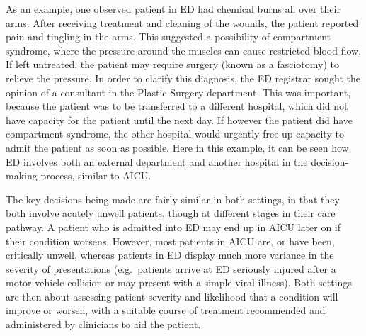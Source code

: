 \documentclass[a4paper, nobind]{templates/ociamthesis}
\begin{document}
\hfill\break
As an example, one observed patient in ED had chemical burns all over their arms. After receiving treatment and cleaning of the wounds, the patient reported pain and tingling in the arms. This suggested a possibility of compartment syndrome, where the pressure around the muscles can cause restricted blood flow. If left untreated, the patient may require surgery (known as a fasciotomy) to relieve the pressure. In order to clarify this diagnosis, the ED registrar sought the opinion of a consultant in the Plastic Surgery department. This was important, because the patient was to be transferred to a different hospital, which did not have capacity for the patient until the next day. If however the patient did have compartment syndrome, the other hospital would urgently free up capacity to admit the patient as soon as possible. Here in this example, it can be seen how ED involves both an external department and another hospital in the decision-making process, similar to AICU.

\hfill\break
The key decisions being made are fairly similar in both settings, in that they both involve acutely unwell patients, though at different stages in their care pathway. A patient who is admitted into ED may end up in AICU later on if their condition worsens. However, most patients in AICU are, or have been, critically unwell, whereas patients in ED display much more variance in the severity of presentations (e.g.~patients arrive at ED seriously injured after a motor vehicle collision or may present with a simple viral illness). Both settings are then about assessing patient severity and likelihood that a condition will improve or worsen, with a suitable course of treatment recommended and administered by clinicians to aid the patient.
\end{document}
